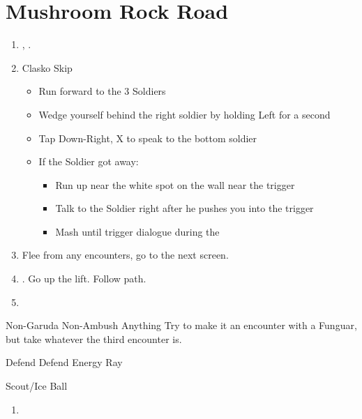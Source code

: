 \chapter{Mushroom Rock Road}

\begin{enumerate}
	\item \sd, \cs.
	\item Clasko Skip
	      \begin{itemize}
		      \item Run forward to the 3 Soldiers
		      \item Wedge yourself behind the right soldier by holding Left for a second
		      \item Tap Down-Right, X to speak to the bottom soldier
		      \item If the Soldier got away:
		            \begin{itemize}
			            \item Run up near the white spot on the wall near the trigger
			            \item Talk to the Soldier right after he pushes you into the trigger
			            \item Mash until trigger dialogue during the \cs
		            \end{itemize}
	      \end{itemize}
	\item Flee from any encounters, go to the next screen.
	\item \save. Go up the lift. Follow path.
	\item \formation{\tidus}{\wakka}{\auron}
\end{enumerate}
\begin{battle}{Non-Garuda Non-Ambush Anything}
	Try to make it an encounter with a Funguar, but take whatever the third encounter is.
	\begin{itemize}
		\switch{\tidus}{\kimahri}
		\kimahrif Defend
		\wakkaf Defend
		\switch{\auron}{\yuna}
		\summon{\valefor}
		\valeforf Energy Ray
	\end{itemize}
\end{battle}
\begin{equip}
	\begin{itemize}
		\wakkaf Scout/Ice Ball
	\end{itemize}
\end{equip}
\begin{enumerate}[resume]
	\item \formation{\tidus}{\wakka}{\auron}
\end{enumerate}
